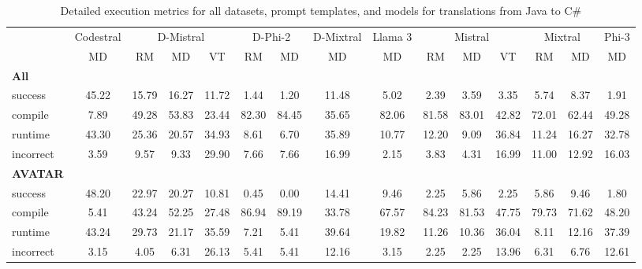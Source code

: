 \begin{table}[t]
\caption{Detailed execution metrics for all datasets, prompt templates, and models for translations from Java to C\#}
\label{tab:iteration_1_stats_percent_Java_Csharp}

\setlength{\tabcolsep}{2.5pt} %
\renewcommand{\arraystretch}{1} %

\footnotesize
\begin{tabular}{@{}lcccccccccccccc@{}}
\toprule
 & Codestral & \multicolumn{3}{c}{D-Mistral} & \multicolumn{2}{c}{D-Phi-2} & D-Mixtral & Llama 3 & \multicolumn{3}{c}{Mistral}  & \multicolumn{2}{c}{Mixtral} & Phi-3 \\ 

\cmidrule(l){2-2}
\cmidrule(l){3-5}
\cmidrule(l){6-7}
\cmidrule(l){8-8}
\cmidrule(l){9-9}
\cmidrule(l){10-12}
\cmidrule(l){13-14}
\cmidrule(l){15-15}

& \multicolumn{1}{c}{MD}
& \multicolumn{1}{c}{RM}
& \multicolumn{1}{c}{MD}
& \multicolumn{1}{c}{VT}
& \multicolumn{1}{c}{RM}
& \multicolumn{1}{c}{MD} 
& \multicolumn{1}{c}{MD} 
& \multicolumn{1}{c}{MD} 
& \multicolumn{1}{c}{RM} 
& \multicolumn{1}{c}{MD} 
& \multicolumn{1}{c}{VT} 
& \multicolumn{1}{c}{RM}
& \multicolumn{1}{c}{MD} 
& \multicolumn{1}{c}{MD} \\

\midrule
\textbf{All} & & & & & & & & & & & & & & \\ 
\quad success & 45.22 & 15.79 & 16.27 & 11.72 & 1.44 & 1.20 & 11.48 & 5.02 & 2.39 & 3.59 & 3.35 & 5.74 & 8.37 & 1.91 \\
\qquad compile & 7.89 & 49.28 & 53.83 & 23.44 & 82.30 & 84.45 & 35.65 & 82.06 & 81.58 & 83.01 & 42.82 & 72.01 & 62.44 & 49.28 \\
\qquad runtime & 43.30 & 25.36 & 20.57 & 34.93 & 8.61 & 6.70 & 35.89 & 10.77 & 12.20 & 9.09 & 36.84 & 11.24 & 16.27 & 32.78 \\
\qquad incorrect & 3.59 & 9.57 & 9.33 & 29.90 & 7.66 & 7.66 & 16.99 & 2.15 & 3.83 & 4.31 & 16.99 & 11.00 & 12.92 & 16.03 \\
 

\textbf{AVATAR} & & & & & & & & & & & & & & \\
\quad success & 48.20 & 22.97 & 20.27 & 10.81 & 0.45 & 0.00 & 14.41 & 9.46 & 2.25 & 5.86 & 2.25 & 5.86 & 9.46 & 1.80 \\
\qquad compile & 5.41 & 43.24 & 52.25 & 27.48 & 86.94 & 89.19 & 33.78 & 67.57 & 84.23 & 81.53 & 47.75 & 79.73 & 71.62 & 48.20 \\
\qquad runtime & 43.24 & 29.73 & 21.17 & 35.59 & 7.21 & 5.41 & 39.64 & 19.82 & 11.26 & 10.36 & 36.04 & 8.11 & 12.16 & 37.39 \\
\qquad incorrect & 3.15 & 4.05 & 6.31 & 26.13 & 5.41 & 5.41 & 12.16 & 3.15 & 2.25 & 2.25 & 13.96 & 6.31 & 6.76 & 12.61 \\
 


\end{tabular}
\end{table}
